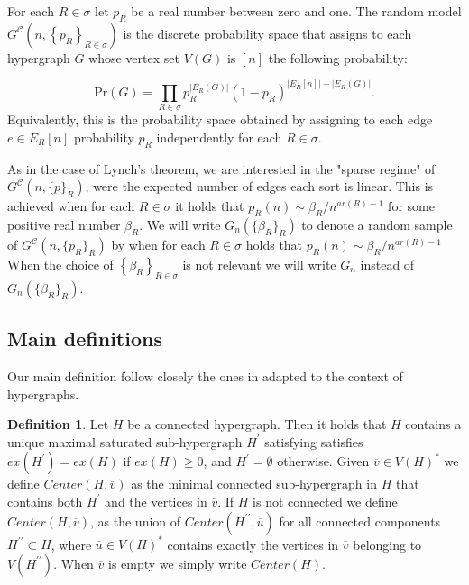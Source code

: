 \documentclass[12pt,notitlepage,a4paper]{article}
\theoremstyle{definition}
\newtheorem{definition}{Definition}[section]
\newcommand{\InR}[1]{\left\{ #1_R \right\}_{R\in \sigma}}
\begin{document}
For each $R\in \sigma$ let
$p_R$ be a real number between zero and one.
The random model $G^{\mathcal{C}}\left(n,\InR{p}\right)$ 
is the discrete probability space that
assigns to each hypergraph $G$ whose vertex
set $V(G)$ is $[n]$ the following probability:

\[ \mathrm{Pr}(G)=\prod_{R\in \sigma} p_R^{|E_R(G)|}
(1-p_R)^{ \big|E_R[n]\big|-\big|E_R(G)\big|}.	
\]
Equivalently, this is the probability space obtained by 
assigning to each edge $e\in E_R[n]$ probability 
$p_R$ independently for each $R\in \sigma$. \par

As in the case of Lynch's theorem, we are interested in the
"sparse regime" of $G^\mathcal{C}(n,\{p\}_R)$, were the 
expected number of edges each sort is linear. 
This is achieved when for each $R\in \sigma$ 
it holds that $p_R(n)\sim \beta_R/n^{ar(R)-1}$ for some 
positive real number $\beta_R$.
We will write $G_n\left(\{\beta_R\}_R\right)$
to denote a random sample of 
$G^\mathcal{C}\left(n,\{p_R\}_{R}\right)$
by when for each $R\in \sigma$ holds that
$p_R(n)\sim \beta_R/n^{ar(R)-1}$
When the choice of $\InR{\beta}$ is not relevant
we will write $G_n$ instead of 
$G_n\left(\{\beta_R\}_R\right)$.\par




\subsection{Main definitions}

Our main definition follow closely the ones in \cite{lynch1992probabilities}
adapted to the context of hypergraphs. 

\begin{definition} 
Let $H$ be a connected hypergraph. Then it holds that
$H$ contains a unique maximal saturated sub-hypergraph $H^\prime$
satisfying satisfies $ex(H^\prime)=ex(H)$ if $ex(H)\geq 0$, and $H^\prime=\emptyset$ 
otherwise. Given
$\overline{v}\in V(H)^*$ we define $Center(H,\overline{v})$ as the 
minimal connected sub-hypergraph in $H$ that contains both $H^\prime$
and the vertices in $\overline{v}$. 
If $H$ is not connected 
we define $Center(H,\overline{v})$,
as the union of $Center(H^{\prime\prime},\overline{u})$
for all connected components $H^{\prime\prime} \subset H$,
where $\overline{u}\in V(H)^*$ contains exactly the vertices
in $\overline{v}$ belonging to $V(H^{\prime\prime})$. When $\overline{v}$
is empty we simply write $Center(H)$.
\end{definition}
\end{document}
